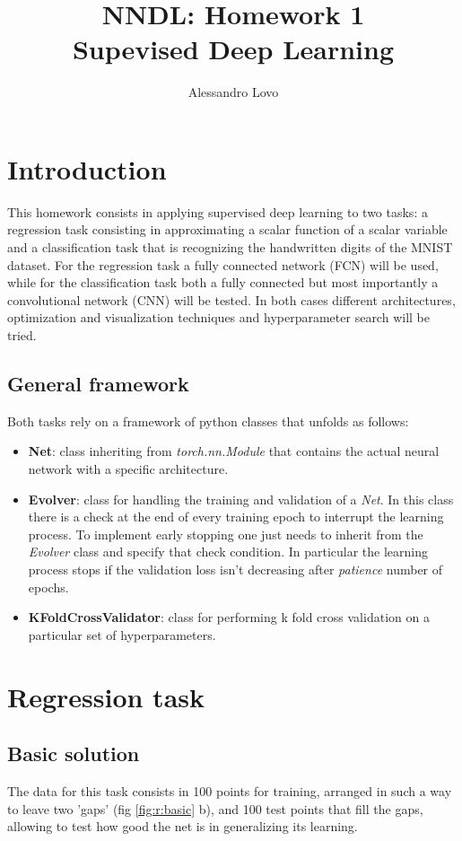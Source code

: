 \documentclass[a4paper, 11pt]{article}
\begin{document}
\title{NNDL: Homework 1 \\ Supevised Deep Learning}
\author{Alessandro Lovo}
\maketitle

\section{Introduction}
  This homework consists in applying supervised deep learning to two tasks: a regression task consisting in approximating a scalar function of a scalar variable and a classification task that is recognizing the handwritten digits of the MNIST dataset. For the regression task a fully connected network (FCN) will be used, while for the classification task both a fully connected but most importantly a convolutional network (CNN) will be tested. In both cases different architectures, optimization and visualization techniques and hyperparameter search will be tried.

  \subsection{General framework}
    Both tasks rely on a framework of python classes that unfolds as follows:
    \begin{itemize}
      \item \textbf{Net}: class inheriting from \emph{torch.nn.Module} that contains the actual neural network with a specific architecture.
      \item \textbf{Evolver}: class for handling the training and validation of a \emph{Net}. In this class there is a check at the end of every training epoch to interrupt the learning process. To implement early stopping one just needs to inherit from the \emph{Evolver} class and specify that check condition. In particular the learning process stops if the validation loss isn't decreasing after \emph{patience} number of epochs.
      \item \textbf{KFoldCrossValidator}: class for performing k fold cross validation on a particular set of hyperparameters.
    \end{itemize}

\section{Regression task}
  \subsection{Basic solution}
    The data for this task consists in 100 points for training, arranged in such a way to leave two 'gaps' (fig \ref{fig:r:basic} b), and 100 test points that fill the gaps, allowing to test how good the net is in generalizing its learning.
\end{document}
